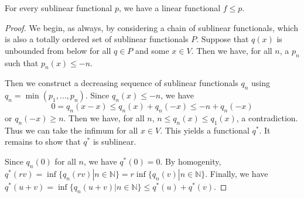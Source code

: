 \documentclass[prb,12pt]{revtex4-2}
\theoremstyle{definition}
\theoremstyle{definition}
\theoremstyle{definition}
\newcommand{\N}{\mathbb{N}}
\begin{document}
\begin{Theorem}
	For every sublinear functional $p$, we have a linear functional $f\le p$. 
\end{Theorem}
\begin{proof}
	We begin, as always, by considering a chain of sublinear functionals, which is also a totally ordered set of sublinear functionals $P$. Suppose that $q(x)$ is unbounded from below for all $q\in P$ and some $x\in V$. Then we have, for all $n$, a $p_n$ such that $p_n(x)\le -n$.

	Then we construct a decreasing sequence of sublinear functionals $q_n$ using $q_n=\min (p_1, \dots, p_n)$. Since $q_n(x)\le -n$, we have
	\[
	0=q_n(x-x)\le q_n(x)+q_n(-x)\le -n +q_n(-x)
	\]
	or $q_n(-x)\ge n$. Then we have, for all $n$, $n\le q_n(x)\le q_1(x)$, a contradiction. Thus we can take the infimum for all $x\in V$. This yields a functional $q^*$. It remains to show that $q^*$ is sublinear. 
	
	Since $q_n(0)$ for all $n$, we have $q^*(0)=0$. By homogenity, $q^*(rv)=\inf \{q_n(r v)|n \in \N\}= r \inf \{q_n(v)|n\in \N\} $. Finally, we have $q^*(u+v) = \inf \{q_n(u+v)|n\in \N\}\le q^*(u)+q^*(v)$.
	\end{proof}
	
\end{document}

